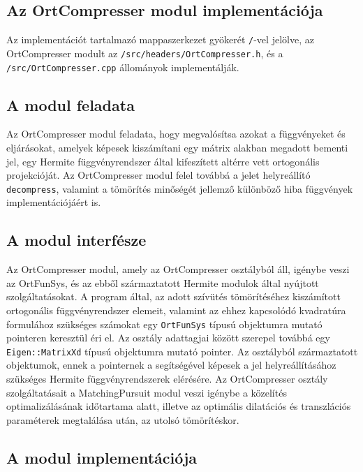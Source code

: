 \documentclass[oneside,titlepage,12pt,a4paper]{report}
\begin{document}
\subsection{Az OrtCompresser modul implementációja}

Az implementációt tartalmazó mappaszerkezet gyökerét \texttt{/}-vel jelölve, az OrtCompresser modult  az \texttt{/src/headers/OrtCompresser.h}, és a \texttt{/src/OrtCompresser.cpp} állományok implementálják.

\subsection*{A modul feladata}

Az OrtCompresser modul feladata, hogy megvalósítsa azokat a függvényeket és eljárásokat, amelyek képesek kiszámítani egy mátrix alakban megadott bementi jel, egy Hermite függvényrendszer által kifeszített altérre vett ortogonális projekcióját. Az OrtCompresser modul felel továbbá a jelet helyreállító  \texttt{decompress}, valamint a tömörítés minőségét jellemző különböző hiba függvények implementációjáért is.

\subsection*{A modul interfésze}

\par Az OrtCompresser modul, amely az OrtCompresser osztályból áll, igénybe veszi az OrtFunSys, és az ebből származtatott Hermite modulok által nyújtott szolgáltatásokat. A program által, az adott szívütés tömörítéséhez kiszámított ortogonális függvényrendszer elemeit, valamint az ehhez kapcsolódó kvadratúra formulához szükséges számokat egy \texttt{OrtFunSys} típusú objektumra mutató pointeren keresztül éri el. Az osztály adattagjai között szerepel továbbá egy \texttt{Eigen::MatrixXd} típusú objektumra mutató pointer. Az osztályból származtatott objektumok, ennek a pointernek a segítségével képesek a jel helyreállításához szükséges Hermite függvényrendszerek elérésére. Az OrtCompresser osztály szolgáltatásait a MatchingPursuit modul veszi igénybe a közelítés optimalizálásának időtartama alatt, illetve az optimális dilatációs és transzlációs paraméterek megtalálása után, az utolsó tömörítéskor.  

\subsection*{A modul implementációja}
\end{document}
